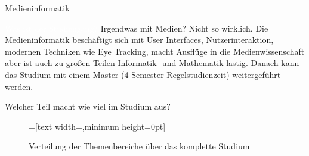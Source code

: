 
\begin{Huge}
    Medieninformatik
\end{Huge}

\begin{exampleblock}{\textcolor{white}{Was ist der Studiengang?}}
    Irgendwas mit Medien? Nicht so wirklich. Die Medieninformatik beschäftigt sich mit User Interfaces, Nutzerinteraktion, modernen Techniken wie Eye Tracking, macht Ausflüge in die Medienwissenschaft aber ist auch zu großen Teilen Informatik- und Mathematik-lastig. Danach kann das Studium mit einem Master (4 Semester Regelstudienzeit) weitergeführt werden.
\end{exampleblock}

\begin{block}{Welcher Teil macht wie viel im Studium aus?}
    \begin{figure}[h!]
        \vspace{-10pt}
        \begin{minipage}{\linewidth}
            \centering
            =[text width={},minimum height=0pt]
        \end{minipage}
        \caption{Verteilung der Themenbereiche über das komplette Studium}
    \end{figure}
\end{block}

